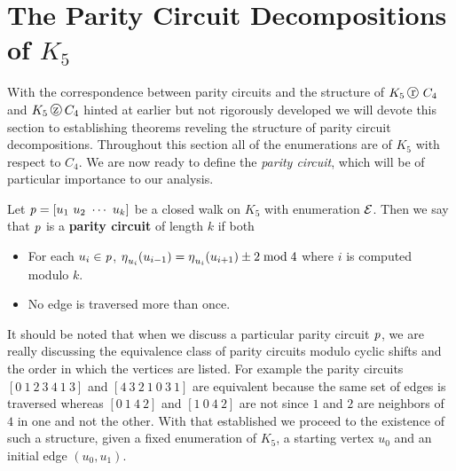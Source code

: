 \section{The Parity Circuit Decompositions of $K_5$}
\label{sec:count-parity-circ}

With the correspondence between parity circuits and the structure of $K_5 \replacement C_4$ and $K_5 \zigzag C_4$ hinted at earlier but not rigorously developed we will devote this section to establishing theorems reveling the structure of parity circuit decompositions. Throughout this section all of the enumerations are of $K_5$ with respect to $C_4$. We are now ready to define the {\em parity circuit}, which will be of particular importance to our analysis. 

\begin{definition}
  \label{def:pcircuit}
Let $\operatorname{\mathit{p}} = \left[ u_1\  u_2\  \cdots\  u_k \right]$ be a closed walk on $K_5$ with enumeration $\operatorname{\mathcal{E}}$. Then we say that $\operatorname{\mathit{p}}$ is a {\bf parity circuit} of length $k$ if both 
  \begin{itemize}
  \item For each $u_{i} \in \operatorname{\mathit{p}}$,  $\operatorname{\eta}_{u_i}( u_{i-1}) = \operatorname{\eta}_{u_{i}}(u_{i+1}) \pm 2 \bmod{4}$ where $i$ is computed modulo $k$. 
  \item No edge is traversed more than once. 
  \end{itemize} 
\end{definition}

It should be noted that when we discuss a particular parity circuit $\operatorname{\mathit{p}}$, we are really discussing the equivalence class of parity circuits modulo cyclic shifts and the order in which the vertices are listed. For example the parity circuits  $\left[ 0\ 1\ 2\ 3\ 4\ 1\ 3 \right]$ and  $\left[4\ 3\  2\  1\  0\  3\  1 \right]$ are equivalent because the same set of edges is traversed whereas $\left[0\ 1\ 4\ 2  \right]$ and $\left[1\ 0\ 4\ 2 \right]$ are not since $1$ and $2$ are neighbors of $4$ in one and not the other.
\noindent
With that established we proceed to the existence of such a structure, given a fixed enumeration of $K_5$, a starting vertex $u_0$ and an initial edge $\left(u_0, u_1\right)$.

